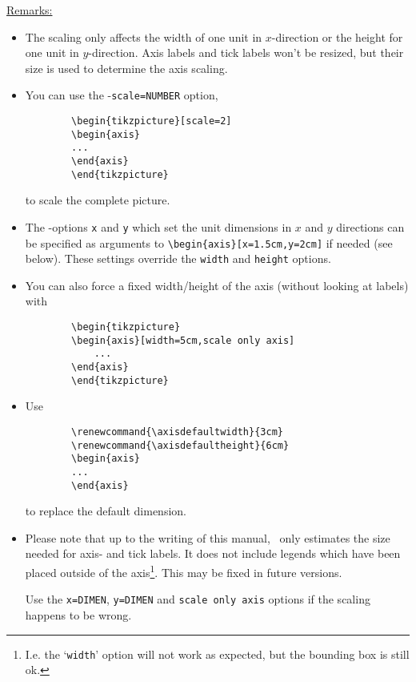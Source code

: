 \noindent\underline{Remarks:} 
\begin{itemize}
	\item The scaling only affects the width of one unit in $x$-direction or the height for one unit in $y$-direction. Axis labels and tick labels won't be resized, but their size is used to determine the axis scaling.

	\item You can use the \Tikz-\lstinline!scale=NUMBER! option,
	\begin{lstlisting}
		\begin{tikzpicture}[scale=2]
		\begin{axis}
		...
		\end{axis}
		\end{tikzpicture}
	\end{lstlisting}
	to scale the complete picture.

	\item The \Tikz-options \lstinline!x! and \lstinline!y! which set the unit dimensions in $x$ and $y$ directions can be specified as arguments to \lstinline!\begin{axis}[x=1.5cm,y=2cm]! if needed (see below). These settings override the \lstinline!width! and \lstinline!height! options.

	\item You can also force a fixed width/height of the axis (without looking at labels) with
	\begin{lstlisting}
		\begin{tikzpicture}
		\begin{axis}[width=5cm,scale only axis]
			...
		\end{axis}
		\end{tikzpicture}
	\end{lstlisting}

	\item Use
	\begin{lstlisting}
		\renewcommand{\axisdefaultwidth}{3cm}
		\renewcommand{\axisdefaultheight}{6cm}
		\begin{axis}
		...
		\end{axis}
	\end{lstlisting}
	to replace the default dimension.

	\item Please note that up to the writing of this manual, \PGFPlots\ only estimates the size needed for axis- and tick labels. It does not include legends which have been placed outside of the axis\footnote{I.e. the `\texttt{width}' option will not work as expected, but the bounding box is still ok.}. This may be fixed in future versions.

	Use the \lstinline!x=DIMEN!, \lstinline!y=DIMEN! and \lstinline!scale only axis! options if the scaling happens to be wrong.
\end{itemize}

